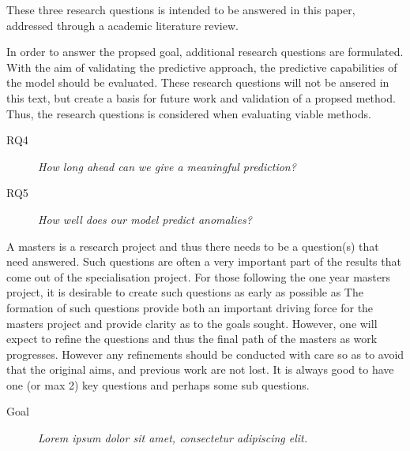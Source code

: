 These three research questions is intended to be answered in this paper, addressed through a academic literature review.
\newline

In order to answer the propsed goal, additional research questions are formulated.
With the aim of validating the predictive approach, the predictive capabilities of the model should be evaluated.
These research questions will not be ansered in this text, but create a basis for future work and validation of a propsed method.
Thus, the research questions is considered when evaluating viable methods.

\begin{description}
    \item[RQ4]{\it How long ahead can we give a meaningful prediction?}
\end{description}

\begin{description}
    \item[RQ5]{\it How well does our model predict anomalies?}
\end{description}




\iffalse
A masters is a research project and thus there needs to be a question(s) that need answered.
Such questions are often a very important part of the results that come out of the specialisation project.
For those following the one year masters project, it is desirable to create such questions as early as possible as   The formation of such questions provide both an important driving force for the masters project and provide clarity as to the goals sought. However, one will expect to refine the questions and thus the final path of the masters as work progresses. However any refinements should be conducted with care so as to avoid that the original aims, and previous work are not lost.  
It is always good to have one (or max 2) key questions and perhaps some sub questions. 

\begin{description}
\item[Goal] {\it Lorem ipsum dolor sit amet, consectetur adipiscing elit.}
\end{description}

